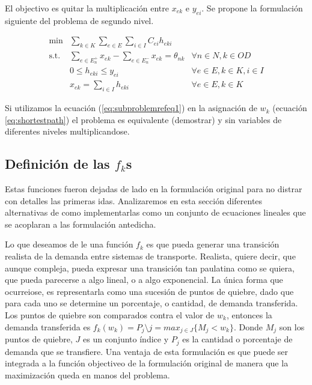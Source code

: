 \documentclass{article}
\begin{document}
  El objectivo es quitar la multiplicación entre $x_{ek}$ e $y_{ei}$. Se propone la formulación siguiente del problema de segundo nivel.

  \begin{align}
    \text{min}  & \sum_{k \in K} \sum_{e \in E} \sum_{i \in I} C_{ei} h_{eki}         & \label{eq:subproblemrefeq1} \\
    \text{s.t.} & \sum_{e \in E_n^+} x_{ek} - \sum_{e \in E_n^-} x_{ek} = \theta_{nk} & \forall n \in N, k \in OD \\
                & 0 \leq h_{eki} \leq y_{ei}                                          & \forall e \in E, k \in K, i \in I \\
                & x_{ek} = \sum_{i \in I} h_{eki}                                     & \forall e \in E, k \in K
  \end{align}

  Si utilizamos la ecuación (\ref{eq:subproblemrefeq1}) en la asignación de $w_k$ (ecuación \ref{eq:shortestpath}) el problema es equivalente (demostrar) y sin variables de diferentes niveles multiplicandose.

  \subsection*{Definición de las $f_k$s}

  Estas funciones fueron dejadas de lado en la formulación original para no distrar con detalles las primeras idas. Analizaremos en esta sección diferentes alternativas de como implementarlas como un conjunto de ecuaciones lineales que se acoplaran a las formulación antedicha.

  Lo que deseamos de le una función $f_k$ es que pueda generar una transición realista de la demanda entre sistemas de transporte. Realista, quiere decir, que aunque compleja, pueda expresar una transición tan paulatina como se quiera, que pueda parecerse a algo lineal, o a algo exponencial. La única forma que ocurreiose, es representarla como una sucesión de puntos de quiebre, dado que para cada uno se determine un porcentaje, o cantidad, de demanda transferida. Los puntos de quiebre son comparados contra el valor de $w_k$, entonces la demanda transferida es $f_k(w_k) = P_j \setminus j = max_{j \in J} \{M_j < w_k\}$. Donde $M_j$ son los puntos de quiebre, $J$ es un conjunto índice y $P_j$ es la cantidad o porcentaje de demanda que se transfiere. Una ventaja de esta formulación es que puede ser integrada a la función objectiveo de la formulación original de manera que la maximización queda en manos del problema.
\end{document}
